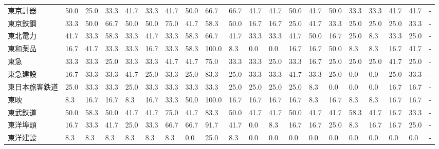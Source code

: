 \begin{tabular}{llllllllllllllllllll}
東京計器            &   50.0 &   25.0 &      33.3 &      41.7 &       33.3 &   41.7 &   50.0 &   66.7 &    66.7 &    41.7 &   41.7 &  50.0 &   41.7 &    50.0 &    33.3 &  33.3 &  41.7 &  41.7 &     - \\
東京鉄鋼            &   33.3 &   50.0 &      66.7 &      50.0 &       50.0 &   75.0 &   41.7 &   58.3 &    50.0 &    16.7 &   16.7 &  25.0 &   41.7 &    33.3 &    25.0 &  25.0 &  25.0 &  33.3 &     - \\
東北電力            &   41.7 &   33.3 &      58.3 &      33.3 &       41.7 &   33.3 &   58.3 &   66.7 &    41.7 &    33.3 &   33.3 &  41.7 &   50.0 &    16.7 &    25.0 &   8.3 &  33.3 &  25.0 &     - \\
東和薬品            &   16.7 &   41.7 &      33.3 &      33.3 &       16.7 &   33.3 &   58.3 &  100.0 &     8.3 &     0.0 &    0.0 &  16.7 &   16.7 &    50.0 &     8.3 &   8.3 &  16.7 &  41.7 &     - \\
東急              &   33.3 &   33.3 &      25.0 &      33.3 &       33.3 &   41.7 &   41.7 &   75.0 &    33.3 &    33.3 &   25.0 &  33.3 &   16.7 &    25.0 &    25.0 &  25.0 &  41.7 &  25.0 &     - \\
東急建設            &   16.7 &   33.3 &      33.3 &      41.7 &       25.0 &   33.3 &   25.0 &   83.3 &    25.0 &    33.3 &   33.3 &  41.7 &   33.3 &    25.0 &     0.0 &   0.0 &  25.0 &  33.3 &     - \\
東日本旅客鉄道         &   25.0 &   33.3 &      33.3 &      25.0 &       33.3 &   33.3 &   33.3 &   33.3 &    25.0 &    25.0 &   25.0 &  25.0 &    8.3 &     0.0 &     0.0 &   0.0 &  16.7 &  16.7 &     - \\
東映              &    8.3 &   16.7 &      16.7 &       8.3 &       16.7 &   33.3 &   50.0 &  100.0 &    16.7 &    16.7 &   16.7 &  16.7 &    8.3 &    16.7 &     8.3 &   8.3 &  16.7 &  16.7 &     - \\
東武鉄道            &   50.0 &   58.3 &      50.0 &      41.7 &       41.7 &   75.0 &   41.7 &   83.3 &    50.0 &    41.7 &   41.7 &  50.0 &   41.7 &    41.7 &    58.3 &  41.7 &  16.7 &  33.3 &     - \\
東洋埠頭            &   16.7 &   33.3 &      41.7 &      25.0 &       33.3 &   66.7 &   66.7 &   91.7 &    41.7 &     0.0 &    8.3 &  16.7 &   16.7 &    25.0 &     8.3 &  16.7 &  16.7 &  25.0 &     - \\
東洋建設            &    8.3 &    8.3 &       8.3 &       8.3 &        8.3 &    8.3 &    0.0 &   25.0 &     8.3 &     0.0 &    0.0 &   0.0 &    0.0 &     0.0 &     0.0 &   0.0 &   0.0 &   0.0 &     - \\

\end{tabular}
